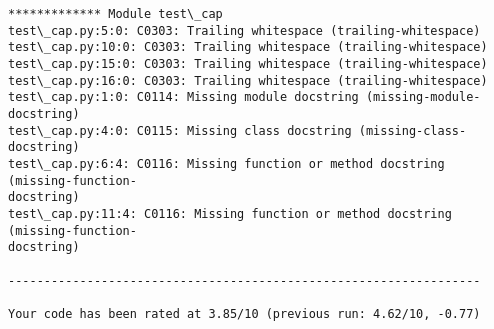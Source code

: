 \documentclass[11pt]{article}
\begin{document}
    \begin{Verbatim}[commandchars=\\\{\}]
************* Module test\_cap
test\_cap.py:5:0: C0303: Trailing whitespace (trailing-whitespace)
test\_cap.py:10:0: C0303: Trailing whitespace (trailing-whitespace)
test\_cap.py:15:0: C0303: Trailing whitespace (trailing-whitespace)
test\_cap.py:16:0: C0303: Trailing whitespace (trailing-whitespace)
test\_cap.py:1:0: C0114: Missing module docstring (missing-module-docstring)
test\_cap.py:4:0: C0115: Missing class docstring (missing-class-docstring)
test\_cap.py:6:4: C0116: Missing function or method docstring (missing-function-
docstring)
test\_cap.py:11:4: C0116: Missing function or method docstring (missing-function-
docstring)

------------------------------------------------------------------

Your code has been rated at 3.85/10 (previous run: 4.62/10, -0.77)



    \end{Verbatim}
\end{document}
